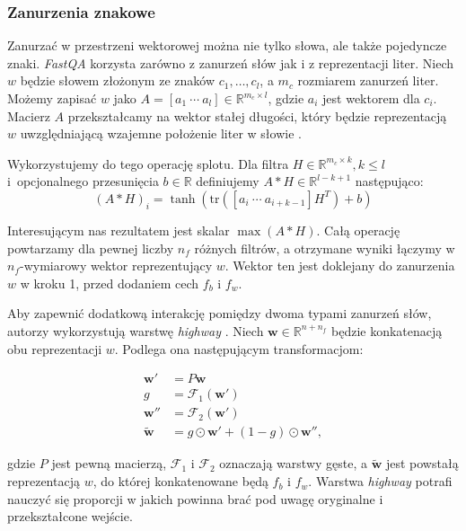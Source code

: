 
\subsubsection{Zanurzenia znakowe}

Zanurzać w przestrzeni wektorowej można nie tylko słowa, ale także pojedyncze znaki. \textit{FastQA} korzysta zarówno z zanurzeń słów jak i z reprezentacji liter. Niech $w$ będzie słowem złożonym ze znaków $c_1,\dots,c_l$, a $m_c$ rozmiarem zanurzeń liter. Możemy zapisać $w$ jako $A = [a_1\ \cdots\ a_l] \in \mathbb{R}^{m_c \times l}$, gdzie $a_i$ jest wektorem dla $c_i$. Macierz $A$ przekształcamy na wektor stałej długości, który będzie reprezentacją $w$ uwzględniającą wzajemne położenie liter w słowie \cite{charemb}.

Wykorzystujemy do tego operację splotu. Dla filtra $H \in \mathbb{R}^{m_c \times k}, k \leq l$ i~opcjonalnego przesunięcia $b \in \mathbb{R}$ definiujemy $A*H \in \mathbb{R}^{l-k+1}$ następująco:
\[(A*H)_i = \tanh(\mathrm{tr}([a_i\ \cdots\ a_{i+k-1}]H^T) + b)\]

Interesującym nas rezultatem jest skalar $\max(A*H)$. Całą operację powtarzamy dla pewnej liczby $n_f$ różnych filtrów, a otrzymane wyniki łączymy w $n_f$-wymiarowy wektor reprezentujący $w$. Wektor ten jest doklejany do zanurzenia $w$ w kroku 1, przed dodaniem cech $f_b$ i $f_w$.

Aby zapewnić dodatkową interakcję pomiędzy dwoma typami zanurzeń słów, autorzy wykorzystują warstwę \textit{highway} \cite{highway}. Niech $\mathbf{w} \in \mathbb{R}^{n+n_f}$ będzie konkatenacją obu reprezentacji $w$. Podlega ona następującym transformacjom:

\[
\begin{aligned}
\mathbf{w}' &= P\mathbf{w}\\
g &= \mathcal{F}_1(\mathbf{w}')\\
\mathbf{w}'' &= \mathcal{F}_2(\mathbf{w}')\\
\tilde{\mathbf{w}} &= g \odot \mathbf{w}' + (1-g) \odot \mathbf{w}'',
\end{aligned}
\]

\noindent
gdzie $P$ jest pewną macierzą, $\mathcal{F}_1$ i $\mathcal{F}_2$ oznaczają warstwy gęste, a $\tilde{\mathbf{w}}$ jest powstałą reprezentacją $w$, do której konkatenowane będą $f_b$ i $f_w$. Warstwa \textit{highway} potrafi nauczyć się proporcji w jakich powinna brać pod uwagę oryginalne i przekształcone wejście.

